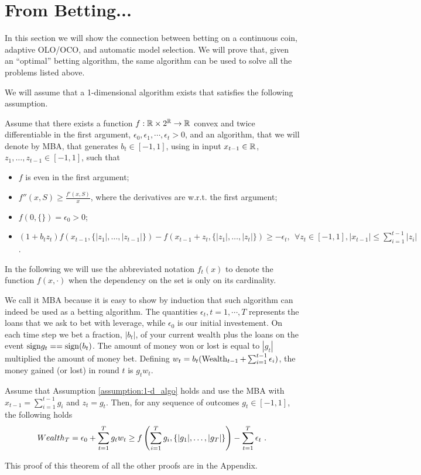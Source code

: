 \section{From Betting...}

In this section we will show the connection between betting on a continuous coin, adaptive \ac{OLO}/\ac{OCO}, and automatic model selection. We will prove that, given an ``optimal'' betting algorithm, the same algorithm can be used to solve all the problems listed above.

We will assume that a 1-dimensional algorithm exists that satisfies the following assumption.
\begin{assumption}
\label{assumption:1-d_algo}
Assume that there exists a function $f:\mathbb{R} \times 2^{\mathbb{R}} \rightarrow \mathbb{R}$ convex and twice differentiable in the first argument, $\epsilon_0, \epsilon_1,\cdots, \epsilon_t>0$, and an algorithm, that we will denote by \ac{MBA}, that generates $b_t \in [-1 , 1]$, using in input $x_{t-1} \in \mathbb{R}$, $z_1, \ldots, z_{t-1} \in [-1,1]$, such that
\begin{itemize}
\item $f$ is even in the first argument;
\item $f''(x, S) \geq \frac{f'(x,S)}{x}$, where the derivatives are w.r.t. the first argument;
\item $f(0,\{\})=\epsilon_0>0$;
\item  $
(1+b_t z_t) f\left( x_{t-1}, \{|z_1|, \ldots, |z_{t-1}|\} \right) - f\left( x_{t-1}+z_t, \{|z_1|, \ldots, |z_t|\}\right) \geq -\epsilon_t, \ \ \forall z_{t} \in [-1,1], |x_{t-1}| \leq \sum_{i=1}^{t-1} |z_i|
$.
\end{itemize}
\end{assumption}
In the following we will use the abbreviated notation $f_t(x)$ to denote the function $f(x,\cdot)$ when the dependency on the set is only on its cardinality.

We call it \ac{MBA} because it is easy to show by induction that such algorithm can indeed be used as a betting algorithm.
The quantities $\epsilon_t, t=1,\cdots,T$ represents the loans that we ask to bet with leverage, while $\epsilon_0$ is our initial investement.
On each time step we bet a fraction, $|b_t|$, of your current wealth plus the loans on the event $\sign{g_t}==\sign(b_t)$.
The amount of money won or lost is equal to $|g_t|$ multiplied the amount of money bet.
Defining $w_t=b_t (\operatorname{Wealth}_{t-1}+\sum_{i=1}^{t-1} \epsilon_i)$, the money gained (or lost) in round $t$ is $g_t w_t$.
\begin{theorem}
\label{theo:1-d_reward}
Assume that Assumption \ref{assumption:1-d_algo} holds and use the \ac{MBA} with $x_{t-1}=\sum_{i=1}^{t-1} g_i$ and $z_t=g_t$.
Then, for any sequence of outcomes $g_t \in [-1,1]$, the following holds
\[
Wealth_T = \epsilon_0 + \sum_{t=1}^T g_t w_t \geq f\left( \sum_{i=1}^{T} g_i , \left\{|g_1|, \ldots, |g_T|\right\}\right)-\sum_{t=1}^T \epsilon_t~.
\]
\end{theorem}
This proof of this theorem of all the other proofs are in the Appendix.

